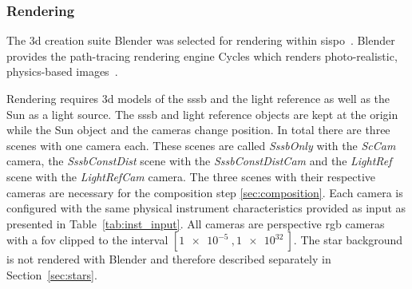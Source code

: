 \begin{table}[htb]
    \centering
    \caption{Input parameters that define the propagation step.}
    \label{tab:sim_prop_input}
\end{table}


\subsubsection{Rendering}
The \gls{3d} creation suite Blender was selected for rendering within \gls{sispo}~\cite{blender}. Blender provides the path-tracing rendering engine Cycles which renders photo-realistic, physics-based images~\cite{Cycles}.

Rendering requires \gls{3d} models of the \gls{sssb} and the light reference as well as the Sun as a light source. The \gls{sssb} and light reference objects are kept at the origin while the Sun object and the cameras change position. In total there are three scenes with one camera each. These scenes are called \textit{SssbOnly} with the \textit{ScCam} camera, the \textit{SssbConstDist} scene with the \textit{SssbConstDistCam} and the \textit{LightRef} scene with the \textit{LightRefCam} camera. The three scenes with their respective cameras are necessary for the composition step \ref{sec:composition}. Each camera is configured with the same physical instrument characteristics provided as input as presented in Table~\ref{tab:inst_input}. All cameras are perspective \gls{rgb} cameras with a \gls{fov} clipped to the interval $[\SI{1e-5}{},\SI{1e32}{}]$. The star background is not rendered with Blender and therefore described separately in Section~\ref{sec:stars}.

